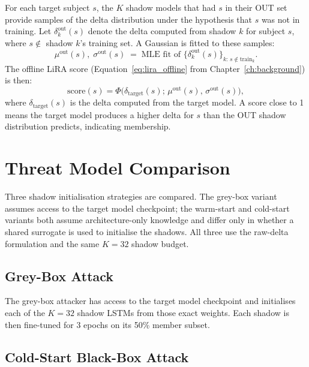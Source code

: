 For each target subject $s$, the $K$ shadow models that had $s$ in their OUT set provide samples of the delta distribution under the hypothesis that $s$ was not in training. Let $\delta^{\text{out}}_k(s)$ denote the delta computed from shadow $k$ for subject $s$, where $s \notin$ shadow $k$'s training set. A Gaussian is fitted to these samples:
\begin{equation}
  \mu^{\text{out}}(s),\; \sigma^{\text{out}}(s)
  \;=\; \text{MLE fit of }
  \bigl\{\delta^{\text{out}}_k(s)\bigr\}_{k:\, s \notin \text{train}_k}.
\end{equation}
The offline LiRA score (Equation~\eqref{eq:lira_offline} from Chapter~\ref{ch:background}) is then:
\begin{equation}
  \text{score}(s)
  = \Phi\!\bigl(\delta_{\text{target}}(s);\,
    \mu^{\text{out}}(s),\, \sigma^{\text{out}}(s)\bigr),
\end{equation}
where $\delta_{\text{target}}(s)$ is the delta computed from the target model. A score close to 1 means the target model produces a higher delta for $s$ than the OUT shadow distribution predicts, indicating membership.

\section{Threat Model Comparison}
\label{sec:mia_threat}

Three shadow initialisation strategies are compared. The grey-box variant assumes access to the target model checkpoint; the warm-start and cold-start variants both assume architecture-only knowledge and differ only in whether a shared surrogate is used to initialise the shadows. All three use the raw-delta formulation and the same $K = 32$ shadow budget.

\subsection{Grey-Box Attack}
\label{ssec:mia_grey}

The grey-box attacker has access to the target model checkpoint and initialises each of the $K = 32$ shadow LSTMs from those exact weights. Each shadow is then fine-tuned for 3 epochs on its 50\% member subset.

\subsection{Cold-Start Black-Box Attack}
\label{ssec:mia_cold}

